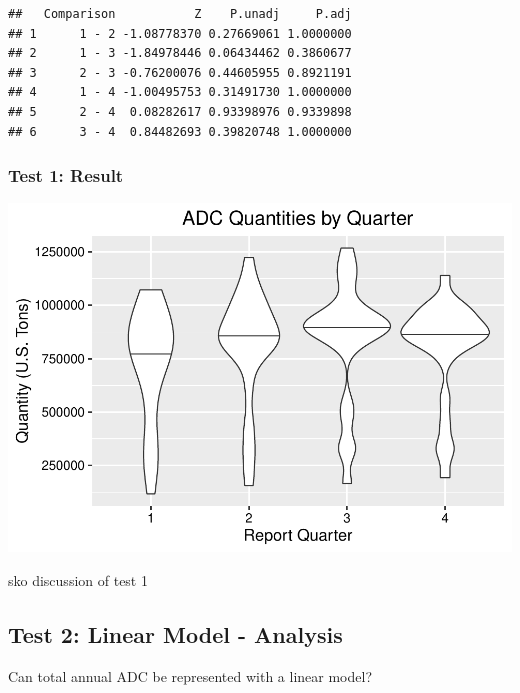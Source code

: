 \documentclass[12pt,]{article}
\begin{document}
\begin{verbatim}
##   Comparison           Z    P.unadj     P.adj
## 1      1 - 2 -1.08778370 0.27669061 1.0000000
## 2      1 - 3 -1.84978446 0.06434462 0.3860677
## 3      2 - 3 -0.76200076 0.44605955 0.8921191
## 4      1 - 4 -1.00495753 0.31491730 1.0000000
## 5      2 - 4  0.08282617 0.93398976 0.9339898
## 6      3 - 4  0.84482693 0.39820748 1.0000000
\end{verbatim}

\subsubsection{Test 1: Result}\label{test-1-result}

\includegraphics{SKo_Project_Template_files/figure-latex/Test1_2-1.pdf}

sko discussion of test 1

\subsection{Test 2: Linear Model -
Analysis}\label{test-2-linear-model---analysis}

Can total annual ADC be represented with a linear model?
\end{document}
